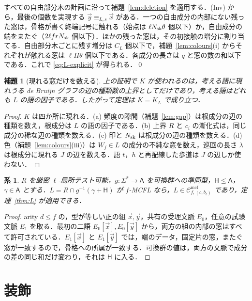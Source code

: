 \documentclass[11pt,a4paper]{ltjsarticle}
\numberwithin{equation}{section}
\theoremstyle{plain}
\newtheorem{lemma}[theorem]{補題}
\newtheorem{corollary}[theorem]{系}
\theoremstyle{definition}
\theoremstyle{remark}
\theoremstyle{plain}
\newcommand{\Cmcf}[2]{\mathcal{C}^{\mathrm{mcf}}_{#1,#2}}
\newcommand{\tuple}[1]{\vec{#1}}
\newcommand{\Kocc}{K_L}
\begin{document}
すべての自由部分木の計画に沿って補題~\ref{lem:deletion} を適用する．(Inv) から，最後の個数を実現する $\tuple y\equiv_{L,s}\tuple x$ がある．一つの自由成分の内部にない残った窓は，骨格が書く終端記号に触れる（始点は $\ell N_{\rm sk}\theta$ 個以下）か，自由成分の端をまたぐ（$2\ell frN_{\rm sk}$ 個以下）．ほかの残った窓は，その初接触の増分に割り当てる．自由部分木ごとに残す増分は $C_L$ 個以下で，補題~\ref{lem:colours}(i) からそれぞれが触れる窓は $\ell H\theta$ 個以下である．各成分の長さは $q$ と窓の数の和以下である．これで \eqref{eq:L-explicit} が得られる．\qed

\begin{lemma}[現れる窓だけを数える]
\label{lem:occurring}
上の証明で $K$ が使われるのは，考える語に現れうる de Bruijn グラフの辺の種類数の上界としてだけであり，考える語はどれも $L$ の語の因子である．したがって定理は $K=\Kocc$ で成り立つ．
\end{lemma}

\begin{proof}
$K$ は四か所に現れる．(a) 頻度の隙間（補題~\ref{lem:gap}）は根成分の辺の種類を数え，根成分は $L$ の語の因子である．(b) 上界 $R$ と $c_i$ の漸化式は，同じ成分の稀な辺の種類を数える．(c) 印と $N_{\rm sk}$ は根成分の辺の種類を数える．(d) 色（補題~\ref{lem:colours}(iii)）は $W_j\in L$ の成分の不純な窓を数え，巡回の長さ $\lambda$ は根成分に現れる $J$ の辺を数える．語 $t$，$h$ と再配線した歩道は $J$ の辺しか使わない．
\end{proof}

\begin{corollary}
\label{cor:SL-coset}
$R$ を厳密 $\ell$-局所テスト可能，$g:\Sigma^*\to\mathsf A$ を可換群への準同型，$\mathsf H\le\mathsf A$，$\gamma\in\mathsf A$ とする．$L=R\cap g^{-1}(\gamma+\mathsf H)$ が $f$-MCFL なら，$L\in\Cmcf{f}{(c,b_\ell)}$ であり，定理~\ref{thm:L} が適用できる．
\end{corollary}

\begin{proof}
arity $d\le f$ の，型が等しい正の組 $\tuple x,\tuple y$，共有の受理文脈 $E_0$，任意の試験文脈 $E_1$ を取る．最初の二語 $E_0[\tuple x],E_0[\tuple y]$ から，両方の組の内部の窓はすべて許可されている．$E_1[\tuple x]$ と $E_1[\tuple y]$ では，端のデータ，固定片の窓，またぐ窓が一致するので，骨格への所属が一致する．可換群の値は，両方の文脈で成分の差の同じ和だけ変わり，それは $\mathsf H$ に入る．
\end{proof}

\section{装飾}
\label{sec:decoration}
\end{document}
